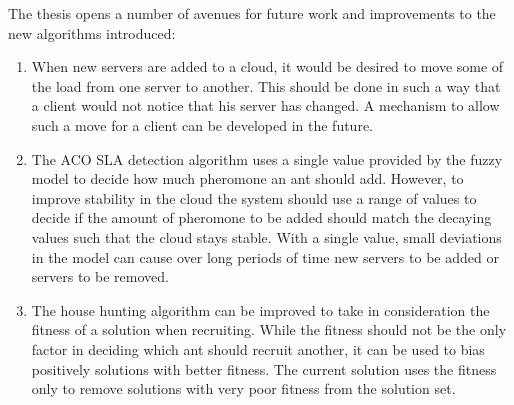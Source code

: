 The thesis opens a number of avenues for future work and improvements to the new algorithms introduced:

\begin{enumerate}
	\item When new servers are added to a cloud, it would be desired to move some of the load from one server to another. This should be done in such a way that a client would not notice that his server has changed. A mechanism to allow such a move for a client can be developed in the future.
	\item The ACO SLA detection algorithm uses a single value provided by the fuzzy model to decide how much pheromone an ant should add. However, to improve stability in the cloud the system should use a range of values to decide if the amount of pheromone to be added should match the decaying values such that the cloud stays stable. With a single value, small deviations in the model can cause over long periods of time new servers to be added or servers to be removed.
	\item The house hunting algorithm can be improved to take in consideration the fitness of a solution when recruiting. While the fitness should not be the only factor in deciding which ant should recruit another, it can be used to bias positively solutions with better fitness. The current solution uses the fitness only to remove solutions with very poor fitness from the solution set.
\end{enumerate}